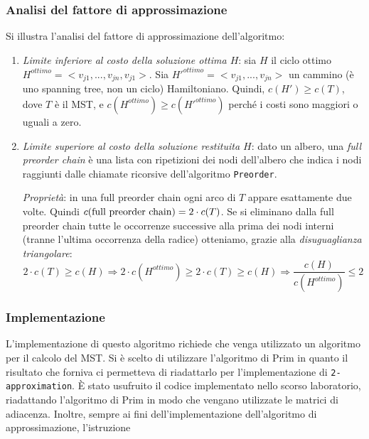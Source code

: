 \subsubsection{Analisi del fattore di approssimazione}
Si illustra l'analisi del fattore di approssimazione dell'algoritmo:
\begin{enumerate}
    \item \textit{Limite inferiore al costo della soluzione ottima $H$}: sia $H$ il ciclo
    ottimo $H^{ottimo} = <v_{j1}, ..., v_{jn}, v_{j1}>$.
    Sia $H'^{ottimo} = <v_{j1}, ..., v_{jn}>$ un cammino
    (è uno spanning tree, non un ciclo) Hamiltoniano. Quindi, $c(H') \ge c(T)$, dove $T$ è
    il MST, e $c(H^{ottimo}) \ge c(H'^{ottimo})$ perché i costi sono maggiori o uguali a zero.

    \item \textit{Limite superiore al costo della soluzione restituita $H$}: dato un albero,
    una \textit{full preorder chain} è una lista con ripetizioni dei nodi dell'albero che
    indica i nodi raggiunti dalle chiamate ricorsive dell'algoritmo \verb|Preorder|.

    \textit{Proprietà}: in una full preorder chain ogni arco di $T$ appare esattamente due
    volte. Quindi $c(\textnormal{full preorder chain}) = 2 \cdot c(T)$. Se si eliminano
    dalla full preorder chain tutte le occorrenze successive alla prima dei nodi interni
    (tranne l'ultima occorrenza della radice) otteniamo, grazie alla
    \textit{disuguaglianza triangolare}:
    \[
        2 \cdot c(T) \ge c(H) \Rightarrow 2 \cdot c(H^{ottimo}) \ge 2 \cdot c(T) \ge c(H)
        \Rightarrow \frac{c(H)}{c(H^{ottimo})} \le 2
    \]

\end{enumerate}

\subsubsection{Implementazione}

L'implementazione di questo algoritmo richiede che venga utilizzato un algoritmo per il 
calcolo del MST. Si è scelto di utilizzare l'algoritmo di Prim in quanto il risultato 
che forniva ci permetteva di riadattarlo per l'implementazione di \verb|2-approximation|.
È stato usufruito il codice implementato nello scorso laboratorio, riadattando 
l'algoritmo di Prim in modo che vengano utilizzate le matrici di adiacenza. 
\label{cambio_istruzione_prim}
Inoltre, sempre ai fini dell'implementazione dell'algoritmo di approssimazione, 
l'istruzione 

